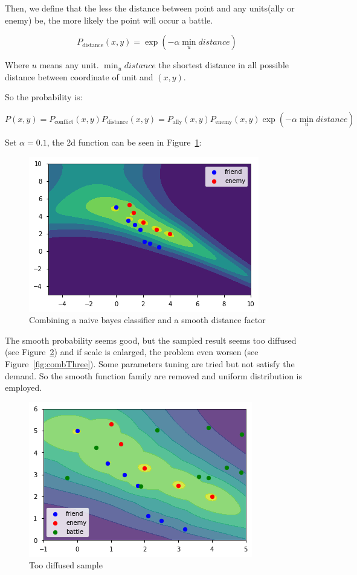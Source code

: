 \documentclass{article}
\begin{document}
Then, we define that the less the distance between point and any units(ally or enemy) be,
the more likely the point will occur a battle.

$$
P_{\text{distance}}(x,y) = \exp(-\alpha \min_{u} distance)
$$

Where $u$ means any unit. $\min_u distance$ the shortest distance in all possible distance 
between coordinate of unit and $(x,y)$.

So the probability is:

$$
P(x,y) = P_{\text{conflict}}(x,y) P_{\text{distance}}(x,y) = 
P_\text{ally}(x,y) P_\text{enemy}(x,y) \exp(-\alpha \min_{u} distance)
$$

Set $\alpha=0.1$, the 2d function can be seen in Figure~\ref{fig:combOne}:

\begin{figure}[h]
\includegraphics[width=0.6\linewidth]{comb1.png}
\caption{Combining a naive bayes classifier and a smooth distance factor}
\label{fig:combOne}
\end{figure}

The smooth probability seems good, but the sampled result seems too diffused 
(see Figure~\ref{fig:combTwo}) and if scale is enlarged, 
the problem even worsen (see Figure~\ref{fig:combThree}).
Some parameters tuning are tried but not satisfy the demand. 
So the smooth function family are removed and uniform distribution is employed. 

\begin{figure}[h]
\includegraphics[width=0.6\linewidth]{comb2.png}
\caption{Too diffused sample}
\label{fig:combTwo}
\end{figure}
\end{document}
